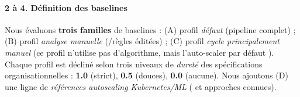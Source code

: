 \paragraph{2 à 4. Définition des baselines}

Nous évaluons \textbf{trois familles} de baselines : (A) profil \emph{défaut} (pipeline  complet) ; (B) profil \emph{analyse manuelle} (/règles éditées) ; (C) profil \emph{cycle principalement manuel} (ce profil n'utilise pas d'algorithme,  mais l'auto-scaler par défaut ). Chaque profil est décliné selon trois niveaux de \emph{dureté} des spécifications organisationnelles : \textbf{1.0} (strict), \textbf{0.5} (douces), \textbf{0.0} (aucune). Nous ajoutons (D) une ligne de \emph{références autoscaling Kubernetes/ML} ( et approches  connues).


